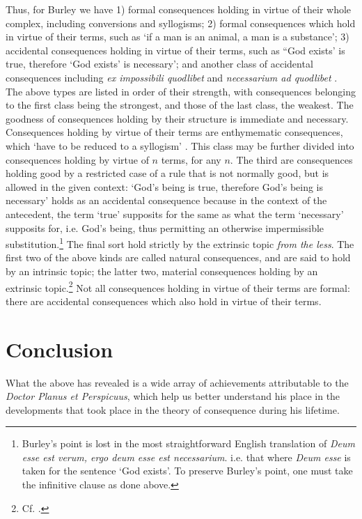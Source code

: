 \documentclass[]{birkjour}
\begin{document}
Thus, for Burley we have 1) formal consequences holding in virtue of their whole complex, including conversions and syllogisms; 2) formal consequences which hold in virtue of their terms, such as `if a man is an animal, a man is a substance'; 3) accidental consequences holding in virtue of their terms, such as ``God exists' is true, therefore `God exists' is necessary'; and another class of accidental consequences including \textit{ex impossibili quodlibet} and \textit{necessarium ad quodlibet} \autocite[pp. 128-129, par. 70]{Green-Pedersen1980b}. The above types are listed in order of their strength, with consequences belonging to the first class being the strongest, and those of the last class, the weakest. The goodness of consequences holding by their structure is immediate and necessary. Consequences holding by virtue of their terms are enthymematic consequences, which `have to be reduced to a syllogism' \autocite[p. 142, par. 117]{Green-Pedersen1980b}. This class may be further divided into consequences holding by virtue of $n$ terms, for any $n$. The third are consequences holding good by a restricted case of a rule that is not normally good, but is allowed in the given context: `God's being is true, therefore God's being is necessary' holds as an accidental consequence because in the context of the antecedent, the term `true' supposits for the same as what the term `necessary' supposits for, i.e. God's being, thus permitting an otherwise impermissible substitution.\footnote{Burley's point is lost in the most straightforward English translation of \textit{Deum esse est verum, ergo deum esse est necessarium}. i.e. that where \textit{Deum esse} is taken for the sentence `God exists'. To preserve Burley's point, one must take the infinitive clause as done above.} The final sort hold strictly by the extrinsic topic \textit{from the less}. The first two of the above kinds are called natural consequences, and are said to hold by an intrinsic topic; the latter two, material consequences holding by an extrinsic topic.\footnote{Cf. \autocite[p. 130]{Martin2004}.} Not all consequences holding in virtue of their terms are formal: there are accidental consequences which also hold in virtue of their terms.

\section{Conclusion}
What the above has revealed is a wide array of achievements attributable to the \textit{Doctor Planus et Perspicuus}, which help us better understand his place in the developments that took place in the theory of consequence during his lifetime. 
\end{document}
